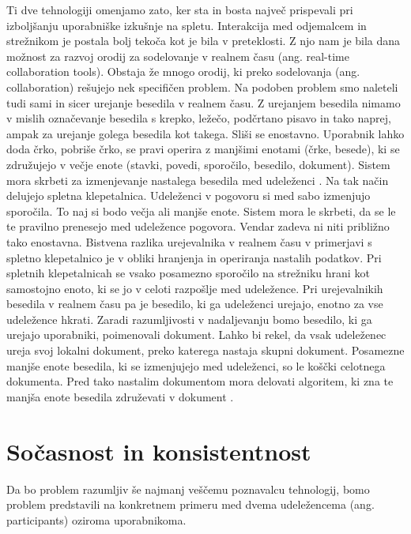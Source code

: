 \documentclass[a4paper, 12pt, twoside]{book}
\begin{document}
Ti dve tehnologiji omenjamo zato, ker sta in bosta največ prispevali pri izboljšanju uporabniške izkušnje na spletu. Interakcija med odjemalcem in strežnikom je postala bolj tekoča kot je bila v preteklosti. Z njo nam je bila dana možnost za razvoj orodij za sodelovanje v realnem času (ang. real-time collaboration tools). Obstaja že mnogo orodij, ki preko sodelovanja (ang. collaboration) rešujejo nek specifičen problem. Na podoben problem smo naleteli tudi sami in sicer urejanje besedila v realnem času. Z urejanjem besedila nimamo v mislih označevanje besedila s krepko, ležečo, podčrtano pisavo in tako naprej, ampak za urejanje golega besedila kot takega. Sliši se enostavno. Uporabnik lahko doda črko, pobriše črko, se pravi operira z manjšimi enotami (črke, besede), ki se združujejo v večje enote (stavki, povedi, sporočilo, besedilo, dokument). Sistem mora skrbeti za izmenjevanje nastalega besedila med udeleženci \cite{gdocs23}. Na tak način delujejo spletna klepetalnica. Udeleženci v pogovoru si med sabo izmenjujo sporočila. To naj si bodo večja ali manjše enote. Sistem mora le skrbeti, da se le te pravilno prenesejo med udeležence pogovora. Vendar zadeva ni niti približno tako enostavna. Bistvena razlika urejevalnika v realnem času v primerjavi s spletno klepetalnico je v obliki hranjenja in operiranja nastalih podatkov. Pri spletnih klepetalnicah se vsako posamezno sporočilo na strežniku hrani kot samostojno enoto, ki se jo v celoti razpošlje med udeležence. Pri urejevalnikih besedila v realnem času pa je besedilo, ki ga udeleženci urejajo, enotno za vse udeležence hkrati. Zaradi razumljivosti v nadaljevanju bomo besedilo, ki ga urejajo uporabniki, poimenovali dokument. Lahko bi rekel, da vsak udeleženec ureja svoj lokalni dokument, preko katerega nastaja skupni dokument. Posamezne manjše enote besedila, ki se izmenjujejo med udeleženci, so le koščki celotnega dokumenta. Pred tako nastalim dokumentom mora delovati algoritem, ki zna te manjša enote besedila združevati v dokument \cite{gdocs22}.

\section{Sočasnost in konsistentnost}
\label{sec:con}

Da bo problem razumljiv še najmanj veščemu poznavalcu tehnologij, bomo problem predstavili na konkretnem primeru \cite{problem} med dvema udeležencema (ang. participants) oziroma uporabnikoma.
\end{document}
